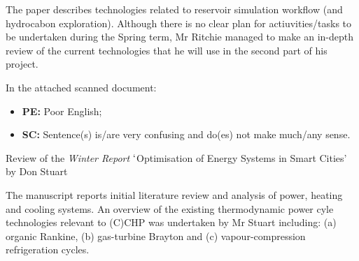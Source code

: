\documentclass[14pt,twoside]{report}
\begin{document}
The paper describes technologies related to reservoir simulation workflow (and hydrocabon exploration). Although there is no clear plan for actiuvities/tasks to be undertaken during the Spring term, Mr Ritchie managed to make an in-depth review of the current technologies that he will use in the second part of his project.

In the attached scanned document:
\begin{itemize}
\item {\bf PE:} Poor English;
\item {\bf SC:} Sentence(s) is/are very confusing and do(es) not make much/any sense.   
\end{itemize}
\medskip




\clearpage


\bigskip

\begin{center}
  {\Large Review of the {\it Winter Report} $\lq$Optimisation of Energy Systems in Smart Cities' by Don Stuart}
\end{center}

The manuscript reports initial literature review and analysis of power, heating and cooling systems. An overview of the existing thermodynamic power cyle technologies relevant to (C)CHP was undertaken by Mr Stuart including: (a) organic Rankine, (b) gas-turbine Brayton and (c) vapour-compression refrigeration cycles.
\end{document}
